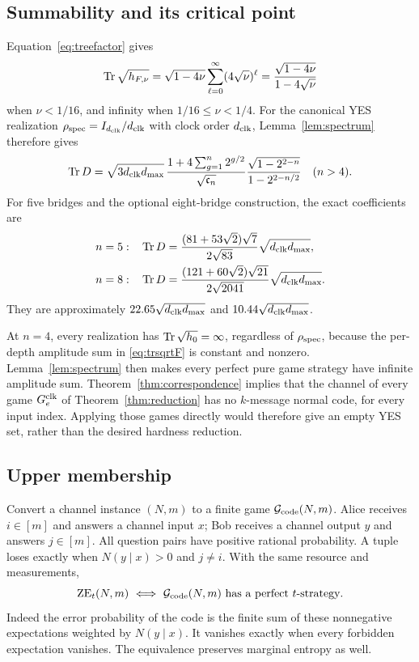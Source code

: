 \subsection{Summability and its critical point}
Equation~\eqref{eq:treefactor} gives
\begin{equation}\label{eq:trsqrtF}
 \operatorname{Tr}\sqrt{h_{F,\nu}}
 =\sqrt{1-4\nu}\sum_{\ell=0}^\infty(4\sqrt\nu)^\ell
 =\frac{\sqrt{1-4\nu}}{1-4\sqrt\nu}
\end{equation}
when $\nu<1/16$, and infinity when $1/16\leq\nu<1/4$. For the canonical YES realization $\rho_{\rm spec}=I_{{d_{\rm clk}}}/{d_{\rm clk}}$ with clock order ${d_{\rm clk}}$, Lemma~\ref{lem:spectrum} therefore gives
\begin{equation}\label{eq:YESsum}
 \operatorname{Tr} D=\sqrt{3{d_{\rm clk}}d_{\max}}\,
 \frac{1+4\sum_{g=1}^n2^{g/2}}{\sqrt{\mathfrak c_n}}
 \frac{\sqrt{1-2^{2-n}}}{1-2^{2-n/2}}\quad(n>4).
\end{equation}
For five bridges and the optional eight-bridge construction, the exact coefficients are
\begin{align}
 n=5:&\quad \operatorname{Tr} D=\frac{(81+53\sqrt2)\sqrt7}{2\sqrt{83}}\sqrt{{d_{\rm clk}}d_{\max}},\label{eq:fiveconstant}\\
 n=8:&\quad \operatorname{Tr} D=\frac{(121+60\sqrt2)\sqrt{21}}{2\sqrt{2041}}\sqrt{{d_{\rm clk}}d_{\max}}.\label{eq:eightconstant}
\end{align}
They are approximately $22.65\sqrt{{d_{\rm clk}}d_{\max}}$ and $10.44\sqrt{{d_{\rm clk}}d_{\max}}$.

\begin{remark}\label{rem:critical}
At $n=4$, every realization has $\operatorname{Tr}\sqrt{h_0}=\infty$, regardless of $\rho_{\rm spec}$, because the per-depth amplitude sum in \eqref{eq:trsqrtF} is constant and nonzero. Lemma~\ref{lem:spectrum} then makes every perfect pure game strategy have infinite amplitude sum. Theorem~\ref{thm:correspondence} implies that the channel of every game $G^{\rm clk}_e$ of Theorem~\ref{thm:reduction} has no $k$-message normal code, for every input index. Applying those games directly would therefore give an empty YES set, rather than the desired hardness reduction.
\end{remark}

\subsection{Upper membership}\label{sec:codeupper}
Convert a channel instance $(N,m)$ to a finite game $\mathcal G_{\rm code}(N,m)$. Alice receives $i\in[m]$ and answers a channel input $x$; Bob receives a channel output $y$ and answers $j\in[m]$. All question pairs have positive rational probability. A tuple loses exactly when $N(y\mid x)>0$ and $j\ne i$. With the same resource and measurements,
\begin{equation}\label{eq:codegame}
 \mathrm{ZE}_t(N,m)\ \Longleftrightarrow\
 \mathcal G_{\rm code}(N,m)\text{ has a perfect }t\text{-strategy}.
\end{equation}
Indeed the error probability of the code is the finite sum of these nonnegative expectations weighted by $N(y\mid x)$. It vanishes exactly when every forbidden expectation vanishes. The equivalence preserves marginal entropy as well.

